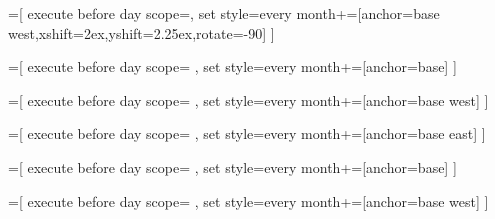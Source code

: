 =[%
  execute before day scope={},
  set style={{every month}+=[anchor=base west,xshift=2ex,yshift=2.25ex,rotate=-90]}
]

=[%
  execute before day scope={%
    },
  set style={{every month}+=[anchor=base]}
]
  
=[%
  execute before day scope={%
    },
  set style={{every month}+=[anchor=base west]}
]



=[%
  execute before day scope={%
    },
  set style={{every month}+=[anchor=base east]}
]
  
=[%
  execute before day scope={%
    },
  set style={{every month}+=[anchor=base]}
]
  
=[%
  execute before day scope={%
    },
  set style={{every month}+=[anchor=base west]}
]




